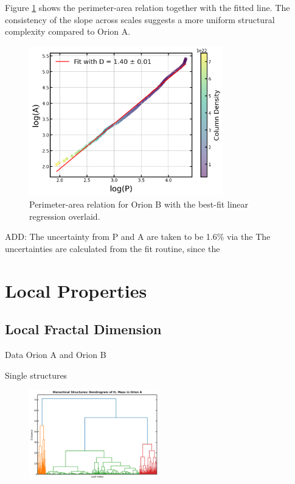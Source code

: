 Figure \ref{fig:orion_B_global} shows the perimeter-area relation together with the fitted line. The consistency of the slope across scales suggests a more uniform structural complexity compared to Orion A.

\begin{figure}[t]
    \centering
    \includegraphics[width=0.75\textwidth]{figures/orion_B_global.png}
    \caption{Perimeter-area relation for Orion B with the best-fit linear regression overlaid.}
    \label{fig:orion_B_global}
\end{figure}

ADD: The uncertainty from P and A are taken to be 1.6\% via the 
The uncertainties are calculated from the fit routine, since the 

\section{Local Properties}

\subsection{Local Fractal Dimension}

Data Orion A and Orion B

Single structures

\begin{figure}[t]
    \centering
    \includegraphics[width=0.5\textwidth]{figures/dendogram_A.png}
    \caption{}
    \label{fig:dendrogram_A}
\end{figure}

